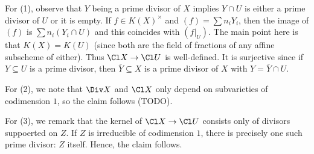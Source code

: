 For (1), observe that $Y$ being a prime divisor of $X$ implies $Y\cap U$ is either
a prime divisor of $U$ or it is empty. If $f \in K(X)^\times$ and $(f) = \sum n_iY_i$,
then the image of $(f)$ is $\sum n_i(Y_i\cap U)$ and this coincides with
$(f|_U)$. The main point here is that $K(X) = K(U)$ (since both are the field of
fractions of any affine subscheme of either). Thus $\Cl X\to \Cl U$ is well-defined.
It is surjective since if $Y \subseteq U$ is a prime divisor, then $\overline{Y} \subseteq X$
is a prime divisor of $X$ with $Y = \overline{Y}\cap U$.

For (2), we note that $\Div X$ and $\Cl X$ only depend on subvarieties of codimension
$1$, so the claim follows (TODO).

For (3), we remark that the kernel of $\Cl X\to \Cl U$ consists only of divisors
suppoerted on $Z$. If $Z$ is irreducible of codimension $1$, there is precisely
one such prime divisor: $Z$ itself. Hence, the claim follows.
